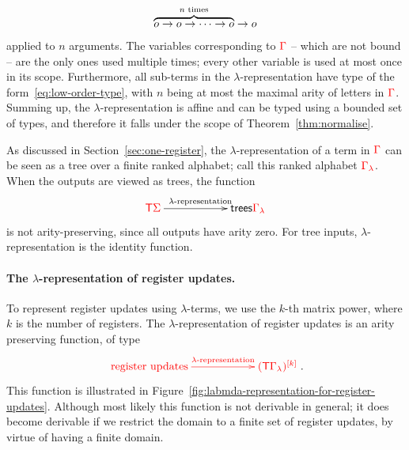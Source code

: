 \begin{align}\label{eq:low-order-type}
\overbrace{o \to o \to \cdots \to o}^{\text{$n$ times}} \to o
\end{align}
applied to $n$ arguments. The variables corresponding to ${\color{red}{\Gamma}}$  -- which are not bound -- are the only ones used multiple times; every other variable is used at most once in its scope.   Furthermore, all sub-terms in the $\lambda$-representation have type of the form~\eqref{eq:low-order-type}, with $n$ being at most the maximal arity of letters in ${\color{red}{\Gamma}}$. Summing up, the $\lambda$-representation is affine and can be typed using a bounded set of types, and therefore it falls under the scope of Theorem~\ref{thm:normalise}.

As discussed in Section~\ref{sec:one-register}, the $\lambda$-representation of a term in ${\color{red}{\Gamma}}$ can be seen as a tree over a finite ranked alphabet; call this ranked alphabet ${\color{red}{\Gamma_\lambda}}$. When the outputs are viewed as trees, the function
\begin{align}\label{eq:lambda-representation-term}
\xymatrix@C=2cm{
    \tmonad \rSigma 
    \ar[r]^{\text{$\lambda$-representation}} &
    \trees {\ranked{\Gamma_\lambda}}
}
\end{align}
is not arity-preserving, since all outputs have arity zero. For tree inputs, $\lambda$-representation is the identity function. 

\paragraph*{The $\lambda$-representation of register updates.} To represent register updates using $\lambda$-terms, we use  the $k$-th matrix power, where  $k$ is the number of registers. The     $\lambda$-representation of register updates is an  arity preserving function, of type
\begin{align}\label{eq:lambda-representation-regup}
\ranked{
    \xymatrix@C=2cm{
 \text{register updates}    \ar[r]^-{\text{$\lambda$-representation}} &
 \mati k {(\tmonad\Gamma_\lambda)}
}
}.
\end{align}
This function is illustrated in Figure~\ref{fig:labmda-representation-for-register-updates}. 
Although most likely this  function is not derivable in general;  it does become derivable if we restrict the domain to a finite set of register updates, by virtue of having a finite domain.



